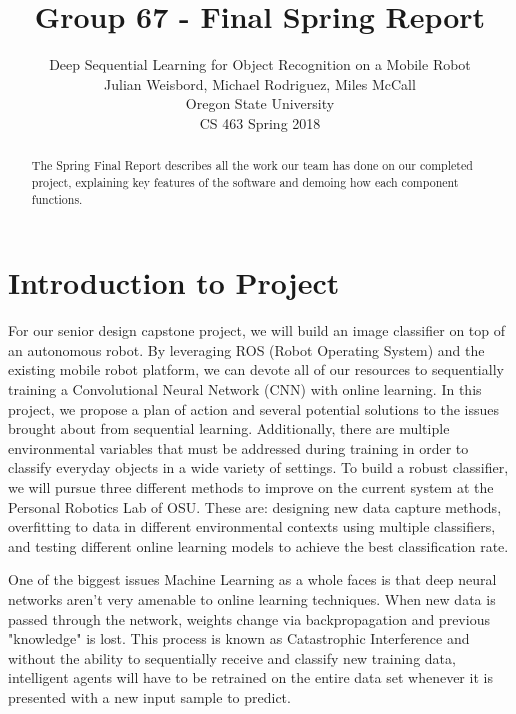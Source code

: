 \documentclass[draftclsnofoot, onecolumn, 10pt, compsoc]{IEEEtran}
\title{Group 67 - Final Spring Report}
\author{
            Deep Sequential Learning for Object Recognition on a Mobile Robot \\
            Julian Weisbord, Michael Rodriguez, Miles McCall \\
            Oregon State University \\
            CS 463 Spring 2018
		}
\begin{document}
\maketitle

\begin{abstract}
  \begin{center}
  	The Spring Final Report describes all the work our team has done on our completed project, explaining key features of the software and demoing how each component functions.  
  \end{center}
\end{abstract}
\newpage

\tableofcontents
\newpage

\section{Introduction to Project}
For our senior design capstone project, we will build an image classifier on top of an autonomous robot. By leveraging ROS (Robot Operating System)  and the existing mobile robot platform, we can devote all of our resources to sequentially training a Convolutional Neural Network (CNN) with online learning. In this project, we propose a plan of action and several potential solutions to the issues brought about from sequential learning. Additionally, there are multiple environmental variables that must be addressed during training in order to classify everyday objects in a wide variety of settings. To build a robust classifier, we will pursue three different methods to improve on the current system at the Personal Robotics Lab of OSU. These are: designing new data capture methods, overfitting to data in different environmental contexts using multiple classifiers, and testing different online learning models to achieve the best classification rate.

One of the biggest issues Machine Learning as a whole faces is that deep neural networks aren't very amenable to online learning techniques. When new data is passed through the network, weights change via backpropagation and previous "knowledge" is lost. This process is known as Catastrophic Interference and without the ability to sequentially receive and classify new training data, intelligent agents will have to be retrained on the entire data set whenever it is presented with a new input sample to predict.
\end{document}
